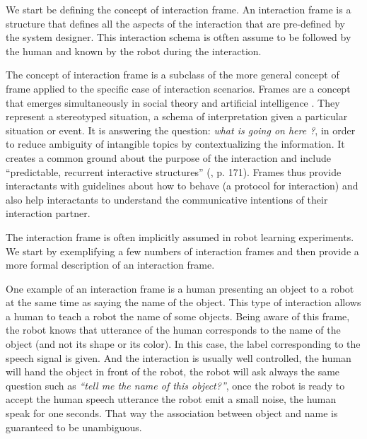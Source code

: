 We start be defining the concept of interaction frame. An interaction frame is a structure that defines all the aspects of the interaction that are pre-defined by the system designer.  This interaction schema is otften assume to be followed by the human and known by the robot during the interaction.

The concept of interaction frame is a subclass of the more general concept of frame applied to the specific case of interaction scenarios. Frames are a concept that emerges simultaneously in social theory \cite{goffman1974frame} and artificial intelligence \cite{minsky1974framework}. They represent a stereotyped situation, a schema of interpretation given a particular situation or event. It is answering the question: \emph{what is going on here ?}, in order to reduce ambiguity of intangible topics by contextualizing the information. It creates a common ground about the purpose of the interaction \cite{tomasello2009cultural,rohlfing2013learning} and include ``predictable, recurrent interactive structures'' (\cite{ninio1996pragmatic}, p. 171). Frames thus provide interactants with guidelines about how to behave (a protocol for interaction) and also help interactants to understand the communicative intentions of their interaction partner.

The interaction frame is often implicitly assumed in robot learning experiments. We start by exemplifying a few numbers of interaction frames and then provide a more formal description of an interaction frame.

One example of an interaction frame is a human presenting an object to a robot at the same time as saying the name of the object. This type of interaction allows a human to teach a robot the name of some objects. Being aware of this frame, the robot knows that utterance of the human corresponds to the name of the object (and not its shape or its color). In this case, the label corresponding to the speech signal is given. And the interaction is usually well controlled, the human will hand the object in front of the robot, the robot will ask always the same question such as \emph{``tell me the name of this object?''}, once the robot is ready to accept the human speech utterance the robot emit a small noise, the human speak for one seconds. That way the association between object and name is guaranteed to be unambiguous.

